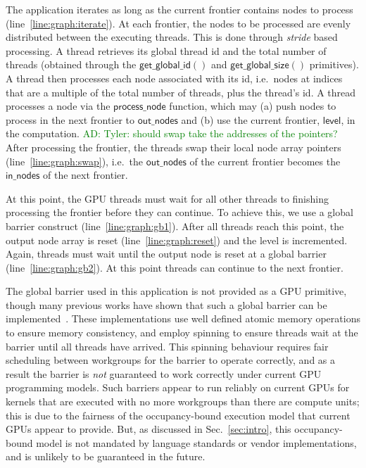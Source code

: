 \documentclass[numbers,nocopyrightspace,10pt]{sigplanconf}
\newcommand{\ADComment}[1]{\textcolor{green}{AD: #1}}
\newcommand{\mysec}{Sec.~}
\newcommand{\getglobalid}{\mathsf{get\_global\_id}}
\newcommand{\getglobalsize}{\mathsf{get\_global\_size}}
\newcommand{\keyword}[1]{\mathsf{#1}}
\begin{document}
The application iterates as long as the current frontier contains
nodes to process (line~\ref{line:graph:iterate}). At each frontier,
the nodes to be processed are evenly distributed between the executing
threads. This is done through \emph{stride} based processing. A thread
retrieves its global thread id and the total number of threads
(obtained through the $\getglobalid()$ and $\getglobalsize()$ primitives). A thread then processes
each node associated with its id, i.e.\ nodes at indices that are a multiple of the total number of threads, plus the thread's id. A thread processes a node via the $\keyword{process\_node}$
function, which may (a) push nodes to process in the next frontier to
$\keyword{out\_nodes}$ and (b) use the current frontier, $\keyword{level}$, in
the computation. \ADComment{Tyler: should swap take the addresses of the pointers?} After processing the frontier, the threads swap their
local node array pointers (line~\ref{line:graph:swap}), i.e.\ the $\keyword{out\_nodes}$ of the current frontier becomes the $\keyword{in\_nodes}$ of the next
frontier.

At this point, the GPU threads must wait for all other threads to
finishing processing the frontier before they can continue. To achieve
this, we use a global barrier construct
(line~\ref{line:graph:gb1}). After all threads reach this point, the
output node array is reset (line~\ref{line:graph:reset}) and the level
is incremented. Again, threads must wait until the output node is
reset at a global barrier (line~\ref{line:graph:gb2}). At this point
threads can continue to the next frontier.

The global barrier used in this application is not provided as a GPU
primitive, though many previous works have shown that such a global
barrier can be implemented~\cite{...}. These implementations use well
defined atomic memory operations to ensure memory consistency, and
employ spinning to ensure threads wait at the barrier until all
threads have arrived.  This spinning behaviour requires fair
scheduling between workgroups for the barrier to operate correctly,
and as a result the barrier is \emph{not} guaranteed to work correctly
under current GPU programming models.  Such barriers appear to run
reliably on current GPUs for kernels that are executed with no more
workgroups than there are compute units; this is due to the fairness
of the occupancy-bound execution model that current GPUs appear to
provide.  But, as discussed in \mysec\ref{sec:intro}, this
occupancy-bound model is not mandated by language standards or vendor
implementations, and is unlikely to be guaranteed in the future.
\end{document}
